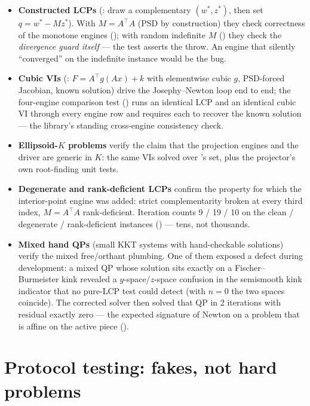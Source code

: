 \begin{itemize}
\item \textbf{Constructed LCPs} (: draw a
  complementary $(w^\ast, z^\ast)$, then set $q = w^\ast - Mz^\ast$). With
  $M = A^\top A$ (PSD by construction) they check correctness of the
  monotone engines (); with random indefinite $M$
  () they check the \emph{divergence guard itself}
  --- the test asserts the throw. An engine that silently ``converged'' on
  the indefinite instance would be the bug.
\item \textbf{Cubic VIs} (: $F = A^\top g(Ax) + k$
  with elementwise cubic $g$, PSD-forced Jacobian, known solution) drive
  the Josephy--Newton loop end to end; the four-engine comparison test
  () runs an identical LCP and an identical cubic
  VI through every engine row and requires each to recover the known
  solution --- the library's standing cross-engine consistency check.
\item \textbf{Ellipsoid-$K$ problems} verify the claim that the projection
  engines and the driver are generic in $K$: the same VIs solved over
  's set, plus the projector's own
  root-finding unit tests.
\item \textbf{Degenerate and rank-deficient LCPs} confirm the property for
  which the interior-point engine was added: strict complementarity broken
  at every third index, $M = A^\top A$ rank-deficient. Iteration counts
  9 / 19 / 10 on the clean / degenerate / rank-deficient instances
  () --- tens, not thousands.
\item \textbf{Mixed hand QPs} (small KKT systems with hand-checkable
  solutions) verify the mixed free/orthant plumbing. One of them exposed a
  defect during development: a mixed QP whose solution sits exactly on a
  Fischer--Burmeister kink revealed a $y$-space/$z$-space confusion in the
  semismooth kink indicator that no pure-LCP test could detect (with
  $n = 0$ the two spaces coincide). The corrected solver then solved that
  QP in 2 iterations with residual exactly zero --- the expected signature
  of Newton on a problem that is affine on the active piece
  ().
\end{itemize}

\section{Protocol testing: fakes, not hard problems}
\label{sec:t-protocol}

